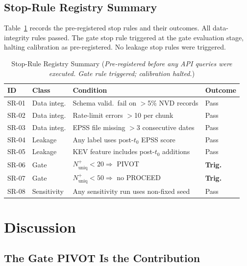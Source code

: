 \documentclass[conference]{IEEEtran}
\begin{document}
\subsection{Stop-Rule Registry Summary}
\label{subsec:results-stoprules}

Table~\ref{tab:stoprules} records the pre-registered stop rules and their
outcomes. All data-integrity rules passed. The gate stop rule triggered
at the gate evaluation stage, halting calibration as pre-registered. No
leakage stop rules were triggered.

\begin{table}[t]
\caption{Stop-Rule Registry Summary (\textit{Pre-registered before any
API queries were executed. Gate rule triggered; calibration halted.})}
\label{tab:stoprules}
\centering
\setlength{\tabcolsep}{3pt}
\footnotesize
\begin{tabular}{@{}l l >{\raggedright\arraybackslash}p{3.4cm} l@{}}
\toprule
\textbf{ID} & \textbf{Class} & \textbf{Condition} & \textbf{Outcome} \\
\midrule
SR-01 & Data integ. & Schema valid.\ fail on $>$5\% NVD records & Pass \\
SR-02 & Data integ. & Rate-limit errors $>$10 per chunk & Pass \\
SR-03 & Data integ. & EPSS file missing $>$3 consecutive dates & Pass \\
SR-04 & Leakage & Any label uses post-$t_0$ EPSS score & Pass \\
SR-05 & Leakage & KEV feature includes post-$t_0$ additions & Pass \\
SR-06 & Gate & $N^+_{\text{uniq}} < 20 \Rightarrow$ PIVOT & \textbf{Trig.} \\
SR-07 & Gate & $N^+_{\text{uniq}} < 50 \Rightarrow$ no PROCEED & \textbf{Trig.} \\
SR-08 & Sensitivity & Any sensitivity run uses non-fixed seed & Pass \\
\bottomrule
\end{tabular}
\end{table}

\section{Discussion}
\label{sec:discussion}

\subsection{The Gate PIVOT Is the Contribution}
\end{document}
